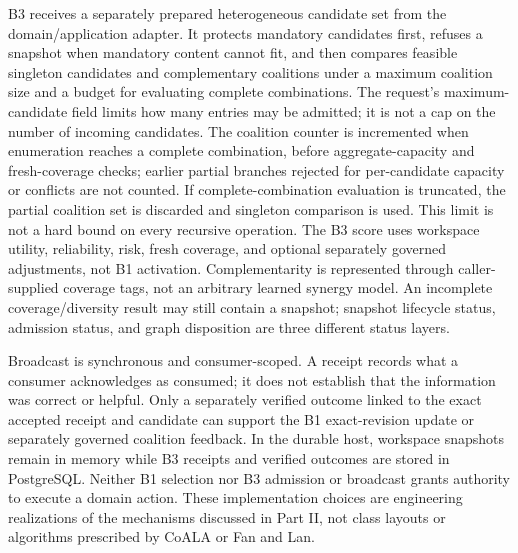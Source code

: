 \begin{chapterrecap}
B3 receives a separately prepared heterogeneous candidate set from the domain/application adapter. It protects mandatory candidates first, refuses a snapshot when mandatory content cannot fit, and then compares feasible singleton candidates and complementary coalitions under a maximum coalition size and a budget for evaluating complete combinations. The request's maximum-candidate field limits how many entries may be admitted; it is not a cap on the number of incoming candidates. The coalition counter is incremented when enumeration reaches a complete combination, before aggregate-capacity and fresh-coverage checks; earlier partial branches rejected for per-candidate capacity or conflicts are not counted. If complete-combination evaluation is truncated, the partial coalition set is discarded and singleton comparison is used. This limit is not a hard bound on every recursive operation. The B3 score uses workspace utility, reliability, risk, fresh coverage, and optional separately governed adjustments, not B1 activation. Complementarity is represented through caller-supplied coverage tags, not an arbitrary learned synergy model. An incomplete coverage/diversity result may still contain a snapshot; snapshot lifecycle status, admission status, and graph disposition are three different status layers.

Broadcast is synchronous and consumer-scoped. A receipt records what a consumer acknowledges as consumed; it does not establish that the information was correct or helpful. Only a separately verified outcome linked to the exact accepted receipt and candidate can support the B1 exact-revision update or separately governed coalition feedback. In the durable host, workspace snapshots remain in memory while B3 receipts and verified outcomes are stored in PostgreSQL. Neither B1 selection nor B3 admission or broadcast grants authority to execute a domain action. These implementation choices are engineering realizations of the mechanisms discussed in Part II, not class layouts or algorithms prescribed by CoALA or Fan and Lan.
\end{chapterrecap}

